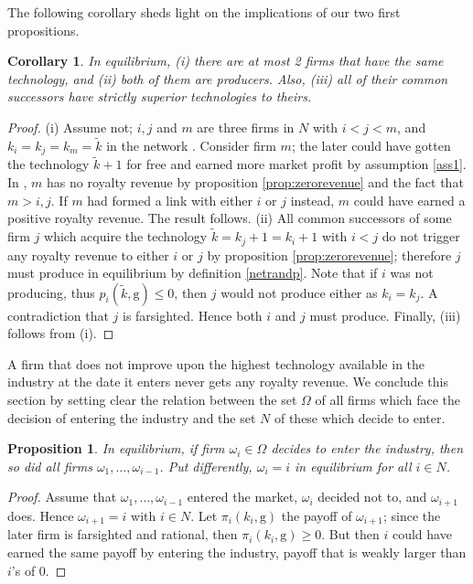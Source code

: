 \documentclass{article}
\newtheorem{corollary}{Corollary}
\newtheorem{proposition}{Proposition}
\begin{document}
The following corollary sheds light on the implications of our two first propositions. \\

\begin{corollary}\label{firmswithsametech}
In equilibrium, (i) there are at most 2 firms that have the same technology, and (ii) both of them are producers. Also, (iii) all of their common successors have strictly superior technologies to theirs. 
\end{corollary}
\begin{proof}
(i) Assume not; $i,j$ and $m$ are three firms in $N$ with $i<j<m$, and $k_i=k_j=k_m=\tilde{k}$ in the network . Consider firm $m$; the later could have gotten the technology $\tilde{k}+1$ for free and earned more market profit by assumption \ref{ass1}. In , $m$ has no royalty revenue by proposition \ref{prop:zerorevenue} and the fact that $m>i,j$. If $m$ had formed a link with either $i$ or $j$ instead, $m$ could have earned a positive royalty revenue. The result follows. (ii) All common successors of some firm $j$ which acquire the technology $\tilde{k}=k_j+1=k_i+1$ with $i<j$ do not trigger any royalty revenue to either $i$ or $j$ by proposition \ref{prop:zerorevenue}; therefore $j$ must produce in equilibrium by definition \ref{netrandp}. Note that if $i$ was not producing, thus $p_i(\tilde{k},\text{g})\leq 0$, then $j$ would not produce either as $k_i=k_j$. A contradiction that $j$ is farsighted. Hence both $i$ and $j$ must produce. Finally, (iii) follows from (i). 
\end{proof}

A firm that does not improve upon the highest technology available in the industry at the date it enters never gets any royalty revenue. We conclude this section by setting clear the relation between the set $\Omega$ of all firms which face the decision of entering the industry and the set $N$ of these which decide to enter. 

\begin{proposition}
In equilibrium, if firm $\omega_i\in \Omega$ decides to enter the industry, then so did all firms $\omega_1,\ldots, \omega_{i-1}$. Put differently, $\omega_i=i$ in equilibrium for all $i\in N$. 
\end{proposition}
\begin{proof}
Assume that $\omega_1,\ldots, \omega_{i-1}$ entered the market, $\omega_i$ decided not to, and $\omega_{i+1}$ does. Hence $\omega_{i+1}=i$ with $i\in N$. Let $\pi_i(k_i,\text{g})$ the payoff of $\omega_{i+1}$; since the later firm is farsighted and rational, then $\pi_i(k_i,\text{g})\geq 0$. But then $i$ could have earned the same payoff by entering the industry, payoff that is weakly larger than $i$'s of 0. 
\end{proof}
\end{document}
